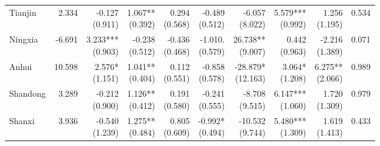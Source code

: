 \documentclass[12pt]{article}
\begin{document}
\begin{landscape}
\begin{small}
\begin{longtable}{lrrrrrrrrr}
    Tianjin & 2.334 & \makecell[r]{-0.127\\(0.911)} & \makecell[r]{1.067**\\(0.392)} & \makecell[r]{0.294\\(0.568)} & \makecell[r]{-0.489\\(0.512)} & \makecell[r]{-6.057\\(8.022)} & \makecell[r]{5.579***\\(0.992)} & \makecell[r]{1.256\\(1.195)} & 0.534 \\
    Ningxia & -6.691 & \makecell[r]{3.233***\\(0.903)} & \makecell[r]{-0.238\\(0.512)} & \makecell[r]{-0.436\\(0.468)} & \makecell[r]{-1.010.\\(0.579)} & \makecell[r]{26.738**\\(9.007)} & \makecell[r]{0.442\\(0.963)} & \makecell[r]{-2.216\\(1.389)} & 0.071 \\
    Anhui & 10.598 & \makecell[r]{2.576*\\(1.151)} & \makecell[r]{1.041**\\(0.404)} & \makecell[r]{0.112\\(0.551)} & \makecell[r]{-0.858\\(0.578)} & \makecell[r]{-28.879*\\(12.163)} & \makecell[r]{3.064*\\(1.208)} & \makecell[r]{6.275**\\(2.066)} & 0.989 \\
    Shandong & 3.289 & \makecell[r]{-0.212\\(0.900)} & \makecell[r]{1.126**\\(0.412)} & \makecell[r]{0.191\\(0.580)} & \makecell[r]{-0.241\\(0.555)} & \makecell[r]{-8.708\\(9.515)} & \makecell[r]{6.147***\\(1.060)} & \makecell[r]{1.720\\(1.309)} & 0.979 \\
    Shanxi & 3.936 & \makecell[r]{-0.540\\(1.239)} & \makecell[r]{1.275**\\(0.484)} & \makecell[r]{0.805\\(0.609)} & \makecell[r]{-0.992*\\(0.494)} & \makecell[r]{-10.532\\(9.744)} & \makecell[r]{5.480***\\(1.309)} & \makecell[r]{1.619\\(1.413)} & 0.433 \\

\end{longtable}
\end{small}
\end{landscape}
\end{document}
